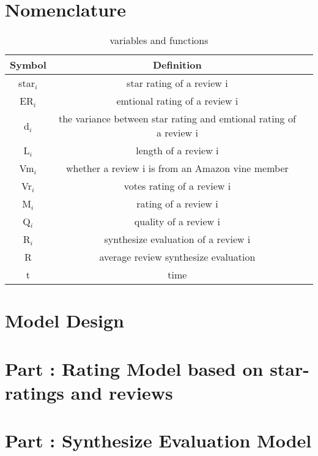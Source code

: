 \documentclass{mcmthesis}
\begin{document}
\section{Nomenclature}
\begin{table}[h]
  \centering
  \begin{tabular}{ccc}
    \hline
    Symbol & Definition\\
    \hline
    star$_{i}$ & star rating of a review i\\
    
	ER$_{i}$ & emtional rating of a review i\\
    
	d$_{i}$ & the variance between star rating and emtional rating of a review i\\

	L$_{i}$ & length of a review i\\

	Vm$_{i}$ & whether a review i is from an Amazon vine member\\
    
	Vr$_{i}$ & votes rating of a review i\\
    
	M$_{i}$ & rating of a review i\\

	Q$_{i}$ & quality of a review i\\
        
	R$_{i}$ & synthesize evaluation of a review i\\
   
	R & average review synthesize evaluation\\
    
	t & time\\
	\hline
  \end{tabular}
  \caption{variables and functions}
\end{table}

\section{ Model Design }

\section{ Part \uppercase\expandafter{}:  Rating Model based on star-ratings and reviews}

\section{ Part \uppercase\expandafter{}:  Synthesize Evaluation Model}
\end{document}
